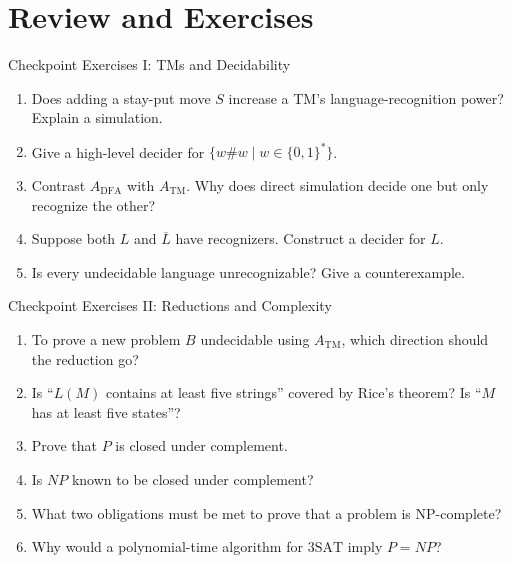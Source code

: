 \documentclass[10pt]{beamer}
\newcommand{\ATM}{A_{\mathrm{TM}}}
\begin{document}
\section{Review and Exercises}

\begin{frame}{Checkpoint Exercises I: TMs and Decidability}
  \begin{enumerate}
    \item Does adding a stay-put move $S$ increase a TM's language-recognition power? Explain a simulation.
    \item Give a high-level decider for $\{w\#w\mid w\in\{0,1\}^*\}$.
    \item Contrast $A_{\mathrm{DFA}}$ with $\ATM$. Why does direct simulation decide one but only recognize the other?
    \item Suppose both $L$ and $\overline L$ have recognizers. Construct a decider for $L$.
    \item Is every undecidable language unrecognizable? Give a counterexample.
  \end{enumerate}
\end{frame}

\begin{frame}{Checkpoint Exercises II: Reductions and Complexity}
  \begin{enumerate}
    \item To prove a new problem $B$ undecidable using $\ATM$, which direction should the reduction go?
    \item Is ``$L(M)$ contains at least five strings'' covered by Rice's theorem? Is ``$M$ has at least five states''?
    \item Prove that $P$ is closed under complement.
    \item Is $NP$ known to be closed under complement?
    \item What two obligations must be met to prove that a problem is NP-complete?
    \item Why would a polynomial-time algorithm for $3\mathrm{SAT}$ imply $P=NP$?
  \end{enumerate}
\end{frame}
\end{document}
